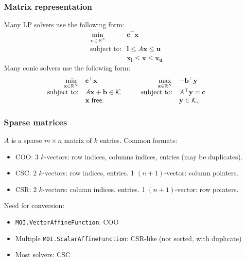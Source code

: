 \documentclass{beamer}
\begin{document}
  \begin{frame}[fragile]
    \frametitle{Matrix representation}
    Many \alert{LP} solvers use the following form:
\[
    \begin{array}{rl}
        \min\limits_{\mathbf{x}\in\mathbb{R}^N} & \mathbf{c}^\top \mathbf{x}\\
        \text{subject to:} & \mathbf{l} \le A\mathbf{x} \le \mathbf{u}\\
                           & \mathbf{x_l} \le \mathbf{x} \le \mathbf{x_u}
    \end{array}
\]
    Many \alert{conic} solvers use the following form:
\[
    \begin{array}{rl}
        \min\limits_{\mathbf{x}\in\mathbb{R}^N} & \mathbf{c}^\top \mathbf{x}\\
        \text{subject to:} & A\mathbf{x} + \mathbf{b} \in \mathcal{K}\\
                           & \mathbf{x}\ \mathsf{free}.
    \end{array}
    \qquad
    \begin{array}{rl}
        \max\limits_{\mathbf{x}\in\mathbb{R}^N} & -\mathbf{b}^\top \mathbf{y}\\
        \text{subject to:} & A^\top \mathbf{y} = \mathbf{c}\\
                           & \mathbf{y} \in \mathcal{K},
    \end{array}
\]
  \end{frame}

  \begin{frame}[fragile]
    \frametitle{Sparse matrices}
    $A$ is a \alert{sparse} $m \times n$ matrix of $k$ entries. Common formats:
    \begin{itemize}
      \item COO: 3 $k$-vectors: row indices, columns indices, entries (may be duplicates).
      \item CSC: 2 $k$-vectors: row indices, entries. 1 $(n+1)$-vector: column pointers.
      \item CSR: 2 $k$-vectors: column indices, entries. 1 $(n+1)$-vector: row pointers.
    \end{itemize}
    Need for \alert{conversion}:
    \begin{itemize}
      \item \texttt{MOI.VectorAffineFunction}: COO
      \item Multiple \texttt{MOI.ScalarAffineFunction}: CSR-like (not sorted, with duplicate)
      \item Most solvers: CSC
    \end{itemize}
  \end{frame}
\end{document}

